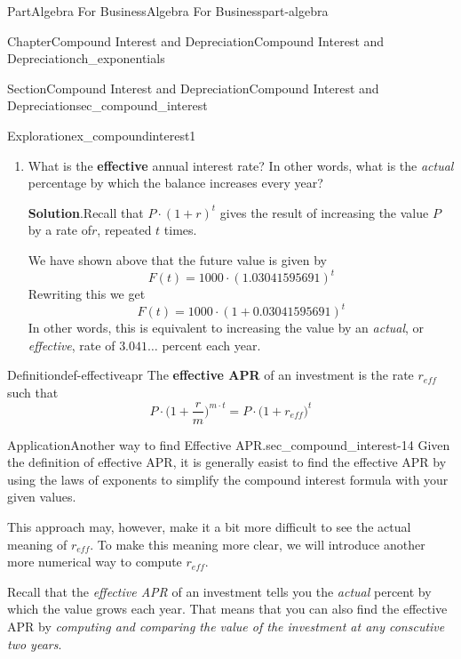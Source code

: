 \documentclass{tufte-book}
\newcommand{\blocktitlefont}{\relax}
\newcommand{\terminology}[1]{\textbf{#1}}
\numberwithin{equation}{chapter}
\begin{document}
\begin{partptx}{Part}{Algebra For Business}{}{Algebra For Business}{}{}{part-algebra}
\begin{chapterptx}{Chapter}{Compound Interest and Depreciation}{}{Compound Interest and Depreciation}{}{}{ch_exponentials}
\begin{sectionptx}{Section}{Compound Interest and Depreciation}{}{Compound Interest and Depreciation}{}{}{sec_compound_interest}
\begin{exploration}{Exploration}{}{ex_compoundinterest1}
\begin{enumerate}[font=\bfseries,label=(\alph*),ref=\alph*]
\begin{equation*}
F(t) = 1000\cdot \left( 1.03041595691 \right)^{t}
\end{equation*}
We have now written \(F(t) = a \cdot b^t\) with \(a=1000\) and \(b = 1.03041595691\).%
\item{}What is the \terminology{effective} annual interest rate?  In other words, what is the  \emph{actual} percentage by which the balance increases every year?%
\par\smallskip%
\noindent\textbf{\blocktitlefont Solution}.\hypertarget{ex_compoundinterest1-5-2}{}\quad{}Recall that \(P\cdot (1+ r)^t\) gives the result of increasing the value \(P\) by a rate of\(r\), repeated \(t\) times.%
\par
We have shown above that the future value is given by%
\begin{equation*}
F(t) = 1000\cdot \left( 1.03041595691 \right)^{t}
\end{equation*}
Rewriting this we get%
\begin{equation*}
F(t) = 1000\cdot \left( 1 + 0.03041595691 \right)^{t}
\end{equation*}
In other words, this is equivalent to increasing the value by an \emph{actual}, or \emph{effective}, rate of \(3.041\dots\) percent each year.%
\end{enumerate}%
\end{exploration}%
\begin{definition}{Definition}{}{def-effectiveapr}%
The \terminology{effective APR} of an investment is the rate \(r_{eff}\) such that%
\begin{equation*}
P \cdot \Big(1 + \frac{r}{m}\Big)^{m\cdot t} = P \cdot \Big(1 + r_{eff}\Big)^{t}
\end{equation*}
%
\end{definition}
\begin{insight}{Application}{Another way to find Effective APR.}{sec_compound_interest-14}%
Given the definition of effective APR, it is generally easist to find the effective APR by using the laws of exponents to simplify the compound interest formula with your given values.%
\par
This approach may, however, make it a bit more difficult to see the actual meaning of \(r_{eff}\). To make this meaning more clear, we will introduce another more numerical way to compute \(r_{eff}\).%
\par
Recall that the \emph{effective APR} of an investment tells you the \emph{actual} percent by which the value grows each year. That means that you can also find the effective APR by \emph{computing and comparing the value of the investment at any conscutive two years}.%

\end{insight}
\end{sectionptx}
\end{chapterptx}
\end{partptx}
\end{document}
